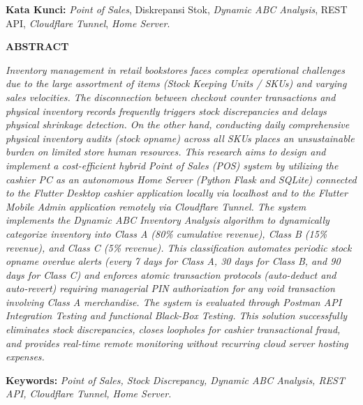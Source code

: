 \documentclass[11pt, a4paper]{article}
\begin{document}
\vspace{0.6cm}
\noindent
\textbf{Kata Kunci:} \textit{Point of Sales}, Diskrepansi Stok, \textit{Dynamic ABC Analysis}, REST API, \textit{Cloudflare Tunnel}, \textit{Home Server}.

\newpage
{}
\begin{center}
    {\large \textbf{ABSTRACT}\par}
\end{center}
\vspace{0.6cm}

\noindent
\textit{Inventory management in retail bookstores faces complex operational challenges due to the large assortment of items (Stock Keeping Units / SKUs) and varying sales velocities. The disconnection between checkout counter transactions and physical inventory records frequently triggers stock discrepancies and delays physical shrinkage detection. On the other hand, conducting daily comprehensive physical inventory audits (stock opname) across all SKUs places an unsustainable burden on limited store human resources. This research aims to design and implement a cost-efficient hybrid Point of Sales (POS) system by utilizing the cashier PC as an autonomous Home Server (Python Flask and SQLite) connected to the Flutter Desktop cashier application locally via localhost and to the Flutter Mobile Admin application remotely via Cloudflare Tunnel. The system implements the Dynamic ABC Inventory Analysis algorithm to dynamically categorize inventory into Class A (80\% cumulative revenue), Class B (15\% revenue), and Class C (5\% revenue). This classification automates periodic stock opname overdue alerts (every 7 days for Class A, 30 days for Class B, and 90 days for Class C) and enforces atomic transaction protocols (auto-deduct and auto-revert) requiring managerial PIN authorization for any void transaction involving Class A merchandise. The system is evaluated through Postman API Integration Testing and functional Black-Box Testing. This solution successfully eliminates stock discrepancies, closes loopholes for cashier transactional fraud, and provides real-time remote monitoring without recurring cloud server hosting expenses.}

\vspace{0.6cm}
\noindent
\textbf{Keywords:} \textit{Point of Sales, Stock Discrepancy, Dynamic ABC Analysis, REST API, Cloudflare Tunnel, Home Server.}
\end{document}
